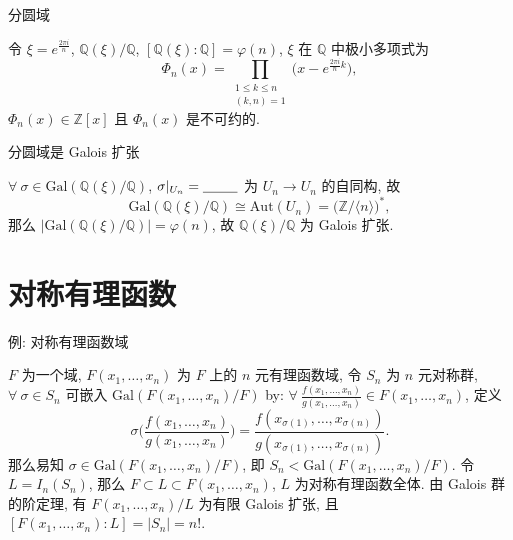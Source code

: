 
\begin{frame}{分圆域}

令 $\xi = e^{\frac{2 \pi i}{n}}$, $\mathbb{Q}(\xi)/\mathbb{Q}$,
$[\mathbb{Q}(\xi):\mathbb{Q}] = \varphi(n)$,
$\xi$ 在 $\mathbb{Q}$ 中极小多项式为
\[
\Phi_n(x) = \prod_{\substack{1 \leq k \leq n \\ (k, n) = 1}}
\Big( x - e^{\frac{2 \pi i}{n} k} \Big),
\]
$\Phi_n(x) \in \mathbb{Z}[x]$ 且 $\Phi_n(x)$ 是不可约的.

\end{frame}


\begin{frame}{分圆域是 Galois 扩张}

$\forall\ \sigma \in \mathrm{Gal}(\mathbb{Q}(\xi)/\mathbb{Q})$,
$\sigma|_{U_n} = \underline{\hspace{2.5em}}$ 为 $U_n \to U_n$ 的自同构,
故
\[
\mathrm{Gal}(\mathbb{Q}(\xi)/\mathbb{Q}) \cong \mathrm{Aut}(U_n)
= \big( \mathbb{Z}/\langle n \rangle \big)^{*},
\]
那么 $|\mathrm{Gal}(\mathbb{Q}(\xi)/\mathbb{Q})| = \varphi(n)$,
故 $\mathbb{Q}(\xi)/\mathbb{Q}$ 为 Galois 扩张.

\end{frame}


\section[对称]{对称有理函数}


\begin{frame}{例: 对称有理函数域}

\begin{eg}
$F$ 为一个域, $F(x_1, \dots, x_n)$ 为 $F$ 上的 $n$ 元有理函数域,
令 $S_n$ 为 $n$ 元对称群, $\forall\ \sigma \in S_n$ 可嵌入
$\mathrm{Gal}(F(x_1, \dots, x_n)/F)$ by:
$\forall\ \frac{f(x_1, \dots, x_n)}{g(x_1, \dots, x_n)} \in F(x_1, \dots, x_n)$,
定义
\[
\sigma\Big( \frac{f(x_1, \dots, x_n)}{g(x_1, \dots, x_n)} \Big)
= \frac{f(x_{\sigma(1)}, \dots, x_{\sigma(n)})}{g(x_{\sigma(1)}, \dots, x_{\sigma(n)})}.
\]
那么易知 $\sigma \in \mathrm{Gal}(F(x_1, \dots, x_n)/F)$,
即 $S_n < \mathrm{Gal}(F(x_1, \dots, x_n)/F)$.
令 $L = I_n(S_n)$, 那么 $F \subset L \subset F(x_1, \dots, x_n)$,
$L$ 为对称有理函数全体.
由 Galois 群的阶定理, 有 $F(x_1, \dots, x_n)/L$ 为有限 Galois 扩张,
且 $[F(x_1, \dots, x_n):L] = |S_n| = n!$.
\end{eg}

\end{frame}

